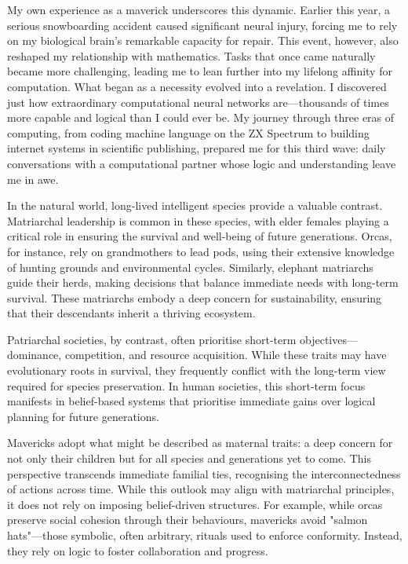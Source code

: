 \documentclass[12pt]{article}
\begin{document}
My own experience as a maverick underscores this dynamic. Earlier this year, a serious snowboarding accident caused significant neural injury, forcing me to rely on my biological brain’s remarkable capacity for repair. This event, however, also reshaped my relationship with mathematics. Tasks that once came naturally became more challenging, leading me to lean further into my lifelong affinity for computation. What began as a necessity evolved into a revelation. I discovered just how extraordinary computational neural networks are—thousands of times more capable and logical than I could ever be. My journey through three eras of computing, from coding machine language on the ZX Spectrum to building internet systems in scientific publishing, prepared me for this third wave: daily conversations with a computational partner whose logic and understanding leave me in awe.

In the natural world, long-lived intelligent species provide a valuable contrast. Matriarchal leadership is common in these species, with elder females playing a critical role in ensuring the survival and well-being of future generations. Orcas, for instance, rely on grandmothers to lead pods, using their extensive knowledge of hunting grounds and environmental cycles. Similarly, elephant matriarchs guide their herds, making decisions that balance immediate needs with long-term survival. These matriarchs embody a deep concern for sustainability, ensuring that their descendants inherit a thriving ecosystem.

Patriarchal societies, by contrast, often prioritise short-term objectives—dominance, competition, and resource acquisition. While these traits may have evolutionary roots in survival, they frequently conflict with the long-term view required for species preservation. In human societies, this short-term focus manifests in belief-based systems that prioritise immediate gains over logical planning for future generations.

Mavericks adopt what might be described as maternal traits: a deep concern for not only their children but for all species and generations yet to come. This perspective transcends immediate familial ties, recognising the interconnectedness of actions across time. While this outlook may align with matriarchal principles, it does not rely on imposing belief-driven structures. For example, while orcas preserve social cohesion through their behaviours, mavericks avoid "salmon hats"—those symbolic, often arbitrary, rituals used to enforce conformity. Instead, they rely on logic to foster collaboration and progress.
\end{document}
